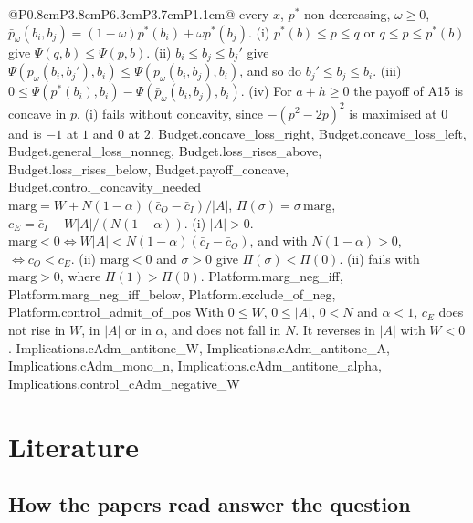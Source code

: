 \begin{longtable}{@{}P{0.8cm}P{3.8cm}P{6.3cm}P{3.7cm}P{1.1cm}@{}}
{  every $x$, $p^*$ non-decreasing, $\omega\ge0$,
  $\bar p_\omega(b_i,b_j)=(1-\omega)p^*(b_i)+\omega p^*(b_j)$.
  (i) $p^*(b)\le p\le q$ or $q\le p\le p^*(b)$ give $\Psi(q,b)\le\Psi(p,b)$.
  (ii) $b_i\le b_j\le b_j'$ give
  $\Psi(\bar p_\omega(b_i,b_j'),b_i)\le\Psi(\bar p_\omega(b_i,b_j),b_i)$, and so
  do $b_j'\le b_j\le b_i$.
  (iii) $0\le\Psi(p^*(b_i),b_i)-\Psi(\bar p_\omega(b_i,b_j),b_i)$.
  (iv) For $a+h\ge0$ the payoff of A15 is concave in $p$.
  (i) fails without concavity, since $-(p^2-2p)^2$ is maximised at $0$ and
  is $-1$ at $1$ and $0$ at $2$.}
  {Budget.concave_loss_right, Budget.concave_loss_left, Budget.general_loss_nonneg, Budget.loss_rises_above, Budget.loss_rises_below, Budget.payoff_concave, Budget.control_concavity_needed}
 \\ \addlinespace
{}
  {$\mathrm{marg}=W+N(1-\alpha)(\bar c_O-\bar c_I)/|A|$, $\Pi(\sigma)=\sigma\,\mathrm{marg}$,
  $c_E=\bar c_I-W|A|/(N(1-\alpha))$.
  (i) $|A|>0$. $\mathrm{marg}<0\iff W|A|<N(1-\alpha)(\bar c_I-\bar c_O)$, and
  with $N(1-\alpha)>0$, $\iff\bar c_O<c_E$.
  (ii) $\mathrm{marg}<0$ and $\sigma>0$ give $\Pi(\sigma)<\Pi(0)$.
  (ii) fails with $\mathrm{marg}>0$, where $\Pi(1)>\Pi(0)$.}
  {Platform.marg_neg_iff, Platform.marg_neg_iff_below, Platform.exclude_of_neg, Platform.control_admit_of_pos}
  {With $0\le W$, $0\le|A|$, $0<N$ and $\alpha<1$, $c_E$ does not rise
  in $W$, in $|A|$ or in $\alpha$, and does not fall in $N$.
  It reverses in $|A|$ with $W<0$.}
  {Implications.cAdm_antitone_W, Implications.cAdm_antitone_A, Implications.cAdm_mono_n, Implications.cAdm_antitone_alpha, Implications.control_cAdm_negative_W}
\end{longtable}
\normalsize

\section{Literature}

\subsection{How the papers read answer the question}

